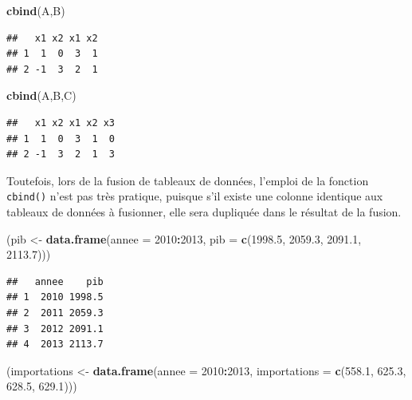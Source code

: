 \documentclass[
  11pt,
]{book}
\newenvironment{Shaded}{\begin{snugshade}}{\end{snugshade}}
\newcommand{\DataTypeTok}[1]{\textcolor[rgb]{0.13,0.29,0.53}{#1}}
\newcommand{\DecValTok}[1]{\textcolor[rgb]{0.00,0.00,0.81}{#1}}
\newcommand{\FloatTok}[1]{\textcolor[rgb]{0.00,0.00,0.81}{#1}}
\newcommand{\KeywordTok}[1]{\textcolor[rgb]{0.13,0.29,0.53}{\textbf{#1}}}
\newcommand{\NormalTok}[1]{#1}
\newcommand{\OperatorTok}[1]{\textcolor[rgb]{0.81,0.36,0.00}{\textbf{#1}}}
\newcommand{\StringTok}[1]{\textcolor[rgb]{0.31,0.60,0.02}{#1}}
\numberwithin{equation}{section}
\numberwithin{countremarque}{section}
\begin{document}
\begin{Shaded}
\begin{Highlighting}[]
\KeywordTok{cbind}\NormalTok{(A,B)}
\end{Highlighting}
\end{Shaded}

\begin{lstlisting}
##   x1 x2 x1 x2
## 1  1  0  3  1
## 2 -1  3  2  1
\end{lstlisting}

\begin{Shaded}
\begin{Highlighting}[]
\KeywordTok{cbind}\NormalTok{(A,B,C)}
\end{Highlighting}
\end{Shaded}

\begin{lstlisting}
##   x1 x2 x1 x2 x3
## 1  1  0  3  1  0
## 2 -1  3  2  1  3
\end{lstlisting}

Toutefois, lors de la fusion de tableaux de données, l'emploi de la fonction \texttt{cbind()} n'est pas très pratique, puisque s'il existe une colonne identique aux tableaux de données à fusionner, elle sera dupliquée dans le résultat de la fusion.

\begin{Shaded}
\begin{Highlighting}[]
\NormalTok{(pib \textless{}{-}}\StringTok{ }\KeywordTok{data.frame}\NormalTok{(}\DataTypeTok{annee =} \DecValTok{2010}\OperatorTok{:}\DecValTok{2013}\NormalTok{, }\DataTypeTok{pib =} \KeywordTok{c}\NormalTok{(}\FloatTok{1998.5}\NormalTok{, }\FloatTok{2059.3}\NormalTok{, }\FloatTok{2091.1}\NormalTok{, }\FloatTok{2113.7}\NormalTok{)))}
\end{Highlighting}
\end{Shaded}

\begin{lstlisting}
##   annee    pib
## 1  2010 1998.5
## 2  2011 2059.3
## 3  2012 2091.1
## 4  2013 2113.7
\end{lstlisting}

\begin{Shaded}
\begin{Highlighting}[]
\NormalTok{(importations \textless{}{-}}\StringTok{ }\KeywordTok{data.frame}\NormalTok{(}\DataTypeTok{annee =} \DecValTok{2010}\OperatorTok{:}\DecValTok{2013}\NormalTok{, }\DataTypeTok{importations =} \KeywordTok{c}\NormalTok{(}\FloatTok{558.1}\NormalTok{, }\FloatTok{625.3}\NormalTok{, }\FloatTok{628.5}\NormalTok{, }\FloatTok{629.1}\NormalTok{)))}
\end{Highlighting}
\end{Shaded}
\end{document}
